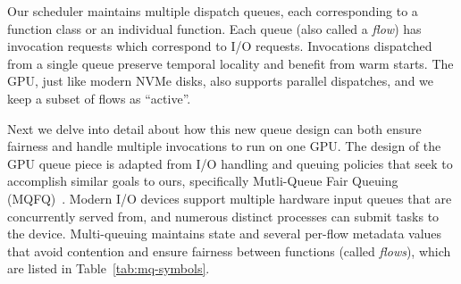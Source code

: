 Our scheduler maintains multiple dispatch queues, each corresponding to a function class or an individual function.
Each queue (also called a \emph{flow}) has invocation requests which correspond to I/O requests.
Invocations dispatched from a single queue preserve temporal locality and benefit from warm starts. 
The GPU, just like modern NVMe disks, also supports parallel dispatches, and we keep a subset of flows as ``active''. 


Next we delve into detail about how this new queue design can both ensure fairness and handle multiple invocations to run on one GPU.
The design of the GPU queue piece is adapted from I/O handling and queuing policies that seek to accomplish similar goals to ours, specifically Mutli-Queue Fair Queuing (MQFQ)~\cite{hedayati2019multi}.
Modern I/O devices support multiple hardware input queues that are concurrently served from, and numerous distinct processes can submit tasks to the device.
Multi-queuing maintains state and several per-flow metadata values that avoid contention and ensure fairness between functions (called \emph{flows}), which are listed in Table~\ref{tab:mq-symbols}.

